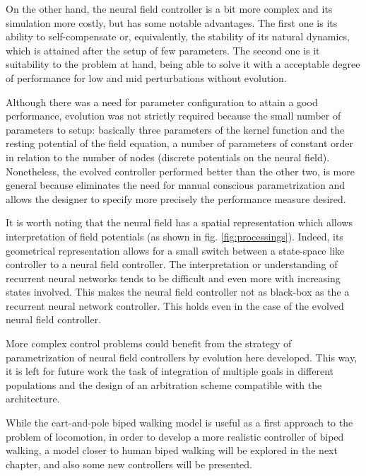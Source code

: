 On the other hand, the neural field controller is a bit more complex
and its simulation more costly, but has some notable advantages. The
first one is its ability to self-compensate or, equivalently, the
stability of its natural dynamics, which is attained after the setup
of few parameters. The second one is it suitability to the problem at
hand, being able to solve it with a acceptable degree of performance
for low and mid perturbations without evolution.

Although there was a need for parameter configuration to attain a good
performance, evolution was not strictly required because the small
number of parameters to setup: basically three parameters of the
kernel function and the resting potential of the field equation, a
number of parameters of constant order in relation to the number of
nodes (discrete potentials on the neural field). Nonetheless, the
evolved controller performed better than the other two, is more
general because eliminates the need for manual conscious
parametrization and allows the designer to specify more precisely the
performance measure desired.

It is worth noting that the neural field has a spatial representation
which allows interpretation of field potentials (as shown in
fig. \ref{fig:processings}). Indeed, its geometrical representation
allows for a small switch between a state-space like controller to a
neural field controller. The interpretation or understanding of
recurrent neural networks tends to be difficult and even more with
increasing states involved. This makes the neural field controller not
as black-box as the a recurrent neural network controller. This holds
even in the case of the evolved neural field controller.

More complex control problems could benefit from the strategy of
parametrization of neural field controllers by evolution here
developed. This way, it is left for future work the task of
integration of multiple goals in different populations and the design
of an arbitration scheme compatible with the architecture.

While the cart-and-pole biped walking model is useful as a first
approach to the problem of locomotion, in order to develop a more
realistic controller of biped walking, a model closer to human biped
walking will be explored in the next chapter, and also some new
controllers will be presented.








